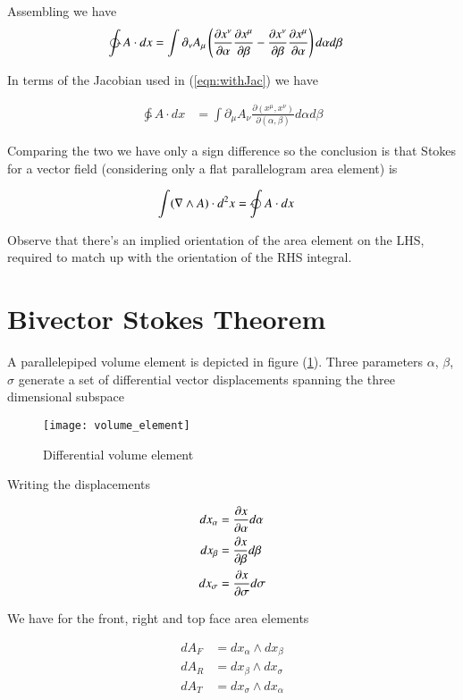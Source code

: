 Assembling we have
\begin{align*}
\ointctrclockwise 
A \cdot dx
&=
\int
\partial_\nu A_\mu \left( \PD{\alpha}{x^\nu} \PD{\beta}{x^\mu} - \PD{\beta}{x^\nu} \PD{\alpha}{x^\mu} \right) d\alpha d\beta
\end{align*}

In terms of the Jacobian used in (\ref{eqn:withJac}) we have

\begin{align*}
\ointctrclockwise 
A \cdot dx &= \int \partial_\mu A_\nu \frac{\partial (x^\mu, x^\nu)}{\partial (\alpha, \beta)} d\alpha d\beta
\end{align*}

Comparing the two we have only a sign difference so the conclusion is that Stokes for a vector field (considering only a flat parallelogram area element) is

\begin{align}
\int ( \grad \wedge A ) \cdot d^2 x &= \ointclockwise A \cdot dx
\end{align}

Observe that there's an implied orientation of the area element on the LHS, required to match up with the orientation of the RHS integral.

\section{Bivector Stokes Theorem}

A parallelepiped volume element is depicted in figure (\ref{fig:volume_element}).  Three parameters $\alpha$, $\beta$, $\sigma$ generate a set of differential vector displacements spanning the three dimensional subspace

\begin{figure}[htp]
\centering
\texttt{[image: volume\_element]}
\caption{Differential volume element}\label{fig:volume_element}
\end{figure}

Writing the displacements 

\begin{align*}
dx_\alpha &= \frac{\partial {x}}{\partial {\alpha}} d\alpha \\
dx_\beta &= \frac{\partial {x}}{\partial {\beta}} d\beta \\
dx_\sigma &= \frac{\partial {x}}{\partial {\sigma}} d\sigma
\end{align*}

We have for the front, right and top face area elements 

\begin{align*}
dA_F &= dx_\alpha \wedge dx_\beta \\
dA_R &= dx_\beta \wedge dx_\sigma \\
dA_T &= dx_\sigma \wedge dx_\alpha \\
\end{align*}

